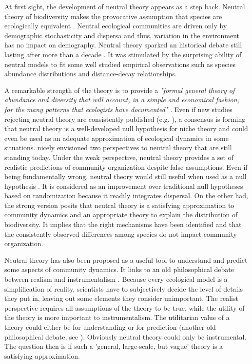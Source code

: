 \documentclass[12pt]{article}
\begin{document}
At first sight, the development of neutral theory appears as a step back.
Neutral theory of biodiversity makes the provocative assumption that species are
ecologically equivalent \parencite{Bell2000,Hubbell2001}. Neutral ecological
communities are driven only by demographic stochasticity and dispersa and thus,
variation in the environment has no impact on demography. Neutral theory sparked
an historical debate still lasting after more than a decade
\parencite{Chave2004, Etienne2011, Rosindell2012,Clark2012}. It was stimulated
by the surprising ability of neutral models to fit some well studied empirical
observations such as species abundance distributions and distance-decay
relationships.

A remarkable strength of the theory is to provide a \emph{"formal general theory
of abundance and diversity that will account, in a simple and economical
fashion, for the many patterns that ecologists have documented"}
\parencite{Bell2001}. Even if new studies rejecting neutral theory are
consistently published (e.g. \textcite{Ricklefs2012}), a consensus is forming
that neutral theory is a well-developed null hypothesis for niche theory and
could even be used as an adequate approximation of ecological dynamics in some
situations. \textcite{Bell2001} nicely envisioned two perspectives to neutral
theory that are still standing today. Under the weak perspective, neutral theory
provides a set of realistic predictions of community organization despite false
assumptions. Even if being fundamentally wrong, neutral theory would still
useful when used as a null hypothesis \parencite{Gotelli2006}. It is considered
as an improvement over traditional null hypotheses based on randomization
\parencite{Gotelli2000} because it readily integrates dispersal. On the other
had, the strong version posits that neutral theory is a satisfying approximation
to community dynamics and an appropriate theory to explain the distribution of
biodiversity. It implies that the right mechanisms have been identified and that
the consistently observed differences among species do not impact community
organization.

Neutral theory has also been proposed as a useful tool to understand and predict
some aspects of community dynamics. It links to an old philosophical debate
between realism and instrumentalism \parencite{Wennekes2012}. Because every
ecological model is a simplification of reality, scientists have to subjectively
decide the level of details they put in, leaving out some elements they consider
unimportant. The realist perspective requires all assumptions of the theory
to be true, while the utility of the theory is more important to
instrumentalism. The utilitarian value of a theory could either be for
understanding or for prediction (another old philosophical debate, see
\textcite{Shmueli2010}). Obviously neutral theory could only be instrumental.
The question then is if such a 'general, large-scale, but vague' theory
\parencite{Wennekes2012} is a satisfying approximation.
\end{document}
